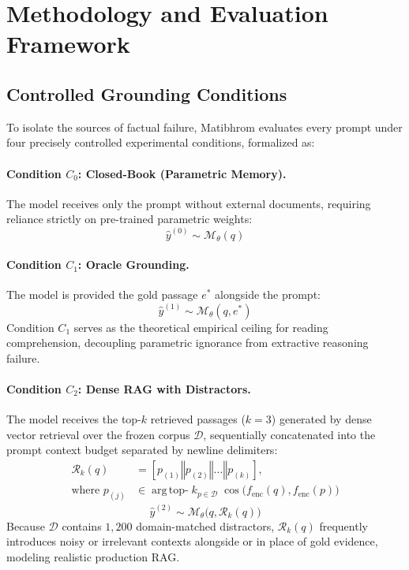 \section{Methodology and Evaluation Framework}
\label{sec:methodology}

\subsection{Controlled Grounding Conditions}
To isolate the sources of factual failure, Matibhrom evaluates every prompt under four precisely controlled experimental conditions, formalized as:

\paragraph{Condition $C_0$: Closed-Book (Parametric Memory).} The model receives only the prompt without external documents, requiring reliance strictly on pre-trained parametric weights:
\begin{equation}
    \hat{y}^{(0)} \sim \mathcal{M}_\theta(q)
\end{equation}

\paragraph{Condition $C_1$: Oracle Grounding.} The model is provided the gold passage $e^*$ alongside the prompt:
\begin{equation}
    \hat{y}^{(1)} \sim \mathcal{M}_\theta(q, e^*)
\end{equation}
Condition $C_1$ serves as the theoretical empirical ceiling for reading comprehension, decoupling parametric ignorance from extractive reasoning failure.

\paragraph{Condition $C_2$: Dense RAG with Distractors.} The model receives the top-$k$ retrieved passages ($k=3$) generated by dense vector retrieval over the frozen corpus $\mathcal{D}$, sequentially concatenated into the prompt context budget separated by newline delimiters:
\begin{equation}
\begin{split}
    \mathcal{R}_k(q) &= [p_{(1)} \mathbin{\Vert} p_{(2)} \mathbin{\Vert} \dots \mathbin{\Vert} p_{(k)}], \\
    \text{where } p_{(j)} &\in \operatorname{arg\,top-}k_{p \in \mathcal{D}} \; \cos\big(f_{\text{enc}}(q), f_{\text{enc}}(p)\big)
\end{split}
\label{eq:rag_retrieval}
\end{equation}
\begin{equation}
    \hat{y}^{(2)} \sim \mathcal{M}_\theta\big(q, \mathcal{R}_k(q)\big)
\end{equation}
Because $\mathcal{D}$ contains $1,200$ domain-matched distractors, $\mathcal{R}_k(q)$ frequently introduces noisy or irrelevant contexts alongside or in place of gold evidence, modeling realistic production RAG.

